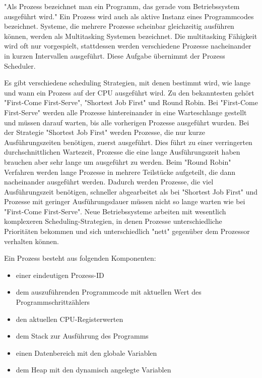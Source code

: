 \documentclass[../main.tex]{subfiles}
\begin{document}
"Als Prozess bezeichnet man ein Programm, das gerade vom Betriebssystem ausgeführt wird." \cite{articleOpenMP} Ein Prozess wird auch als aktive Instanz eines Programmcodes bezeichnet. Systeme, die mehrere Prozesse scheinbar gleichzeitig ausführen können, werden als Multitasking Systemen bezeichnet. Die multitasking Fähigkeit wird oft nur vorgespielt, stattdessen werden verschiedene Prozesse nacheinander in kurzen Intervallen ausgeführt. Diese Aufgabe übernimmt der Prozess Scheduler. \par
Es gibt verschiedene scheduling Strategien, mit denen bestimmt wird, wie lange und wann ein Prozess auf der CPU ausgeführt wird. Zu den bekanntesten gehört "First-Come First-Serve", "Shortest Job First" und Round Robin. Bei "First-Come First-Serve" werden alle Prozesse hintereinander in eine Warteschlange gestellt und müssen darauf warten, bis alle vorherigen Prozesse ausgeführt wurden. Bei der Strategie "Shortest Job First" werden Prozesse, die nur kurze Ausführungszeiten benötigen, zuerst ausgeführt. Dies führt zu einer verringerten durchschnittlichen Wartezeit, Prozesse die eine lange Ausführungszeit haben brauchen aber sehr lange um ausgeführt zu werden.
Beim "Round Robin" Verfahren werden lange Prozesse in mehrere Teilstücke aufgeteilt, die dann nacheinander ausgeführt werden. Dadurch werden Prozesse, die viel Ausführungszeit benötigen, schneller abgearbeitet als bei "Shortest Job First" und Prozesse mit geringer Ausführungsdauer müssen nicht so lange warten wie bei "First-Come First-Serve". 
Neue Betriebssysteme arbeiten mit wesentlich komplexeren Scheduling-Strategien, in denen Prozesse unterschiedliche Prioritäten bekommen und sich unterschiedlich "nett" gegenüber dem Prozessor verhalten können. \cite{scriptProzessScheduling}

Ein Prozess besteht aus folgenden Komponenten:
\begin{itemize}
	\item einer eindeutigen Prozess-ID
	\item dem auszuführenden Programmcode mit aktuellen Wert des Programmschrittzählers
	\item den aktuellen CPU-Registerwerten
	\item dem Stack zur Ausführung des Programms
	\item einen Datenbereich mit den globale Variablen
	\item dem Heap mit den dynamisch angelegte Variablen
\end{itemize} \cite{articleOpenMP}
\end{document}
